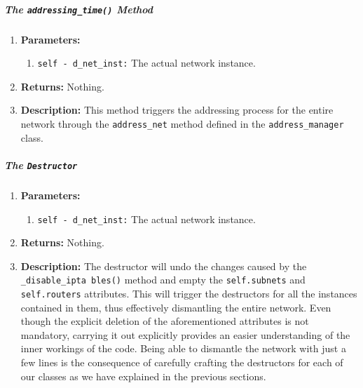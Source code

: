         \subparagraph{The \texttt{addressing\_time()} Method}
            \begin{enumerate}
                \item \textbf{Parameters:}
                \begin{enumerate}
                    \item \texttt{self - d\_net\_inst:} The actual network instance.
                \end{enumerate}
                \item \textbf{Returns:} Nothing.
                \item \textbf{Description:} This method triggers the addressing process for the entire network through the \texttt{address\_net} method defined in the \texttt{address\_manager} class.
            \end{enumerate}

        \subparagraph{The \texttt{Destructor}}
            \begin{enumerate}
                \item \textbf{Parameters:}
                \begin{enumerate}
                    \item \texttt{self - d\_net\_inst:} The actual network instance.
                \end{enumerate}
                \item \textbf{Returns:} Nothing.
                \item \textbf{Description:} The destructor will undo the changes caused by the \texttt{\_disable\_ipta bles()} method and empty the \texttt{self.subnets} and \texttt{self.routers} attributes. This will trigger the destructors for all the instances contained in them, thus effectively dismantling the entire network. Even though the explicit deletion of the aforementioned attributes is not mandatory, carrying it out explicitly provides an easier understanding of the inner workings of the code. Being able to dismantle the network with just a few lines is the consequence of carefully crafting the destructors for each of our classes as we have explained in the previous sections.
            \end{enumerate}

